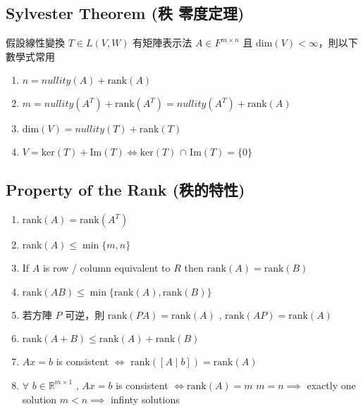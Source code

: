\documentclass[
]{book}
\providecommand{\tightlist}{%
  \setlength{\itemsep}{0pt}\setlength{\parskip}{0pt}}
\begin{document}
\hypertarget{sylvester-theorem-ux79e9-ux96f6ux5ea6ux5b9aux7406}{%
\subsection{Sylvester Theorem (秩 零度定理)}\label{sylvester-theorem-ux79e9-ux96f6ux5ea6ux5b9aux7406}}

假設線性變換 \(T \in L(V,W)\) 有矩陣表示法 \(A \in F^{m \times n}\) 且 \(\mbox{dim}(V) < \infty\)，則以下數學式常用

\begin{enumerate}
\def\labelenumi{\arabic{enumi}.}
\tightlist
\item
  \(n = nullity(A) + \mbox{rank}(A)\)
\item
  \(m = nullity(A^T) + \mbox{rank}(A^T) = nullity(A^T) + \mbox{rank}(A)\)
\item
  \(\mbox{dim}(V) = nullity(T) + \mbox{rank}(T)\)
\item
  \(V = \mbox{ker}(T) + \mbox{Im}(T) \iff \mbox{ker}(T)\) \(\cap\) \(\mbox{Im}(T) = \{0\}\)
\end{enumerate}

\hypertarget{property-of-the-rank-ux79e9ux7684ux7279ux6027}{%
\subsection{Property of the Rank (秩的特性)}\label{property-of-the-rank-ux79e9ux7684ux7279ux6027}}

\begin{enumerate}
\def\labelenumi{\arabic{enumi}.}
\tightlist
\item
  \(\mbox{rank}(A) = \mbox{rank}(A^T)\)
\item
  \(\mbox{rank}(A) \leq \min\{m,n\}\)
\item
  If \(A\) is row / column equivalent to \(R\) then \(\mbox{rank}(A) = \mbox{rank}(B)\)
\item
  \(\mbox{rank}(AB) \leq \min \{\mbox{rank}(A), \mbox{rank}(B)\}\)
\item
  若方陣 \(P\) 可逆，則 \(\mbox{rank}(PA) = \mbox{rank}(A)\) , \(\mbox{rank}(AP) = \mbox{rank}(A)\)
\item
  \(\mbox{rank}(A+ B) \leq \mbox{rank}(A) + \mbox{rank}(B)\)
\item
  \(Ax = b\) is consistent \(\iff\) \(\mbox{rank}([A \mid b]) = \mbox{rank}(A)\)
\item
  \(\forall\) \(b \in \mathbb{R}^{m \times 1}\) , \(Ax = b\) is consistent \(\iff \mbox{rank}(A) = m\)
  \(m=n \implies\) exactly one solution
  \(m < n \implies\) infinty solutions
\end{enumerate}
\end{document}
